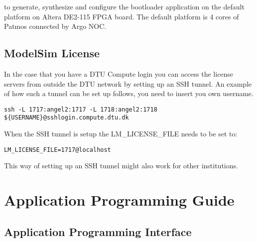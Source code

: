 \documentclass[a4paper,fontsize=10pt,twoside,DIV15,BCOR12mm,headinclude=true,footinclude=false,pagesize,bibtotoc]{scrbook}
\newcommand{\code}[1]{{\texttt{#1}}}
\newcommand{\comment}[3]{

\textsf{\textbf{#1}} {\color{#3}#2}}
\newcommand{\martin}[1]{\comment{Martin}{#1}{Blue}}
\begin{document}
to generate, synthesize and configure the bootloader application on the default platform on Altera DE2-115 FPGA board. The default platform is 4 cores of Patmos connected by Argo NOC.

\section{ModelSim License}
In the case that you have a DTU Compute login you can access the license servers from outside the DTU network by setting up an SSH tunnel.
An example of how such a tunnel can be set up follows, you need to insert you own username.

\begin{verbatim}
ssh -L 1717:angel2:1717 -L 1718:angel2:1718 ${USERNAME}@sshlogin.compute.dtu.dk
\end{verbatim}

When the SSH tunnel is setup the LM\_LICENSE\_FILE needs to be set to:
\begin{verbatim}
LM_LICENSE_FILE=1717@localhost
\end{verbatim}

This way of setting up an SSH tunnel might also work for other institutions.

%
%
%
%


\chapter{Application Programming Guide}

\section{Application Programming Interface}
\label{sec:api}
\end{document}
